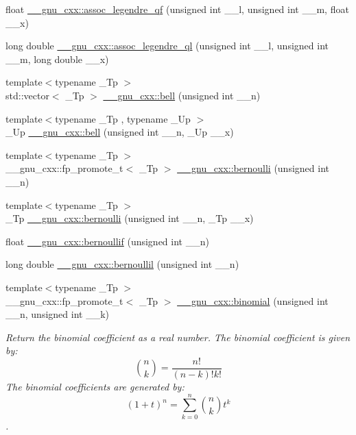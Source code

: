 \begin{DoxyCompactItemize}
\item 
float \hyperlink{group__mathsf__gnu_ga61d651dc8b3c42fe47a02b36e95f72c0}{\+\_\+\+\_\+gnu\+\_\+cxx\+::assoc\+\_\+legendre\+\_\+qf} (unsigned int \+\_\+\+\_\+l, unsigned int \+\_\+\+\_\+m, float \+\_\+\+\_\+x)
\item 
long double \hyperlink{group__mathsf__gnu_ga07a9e571759c6d24e96da8cc8268f91e}{\+\_\+\+\_\+gnu\+\_\+cxx\+::assoc\+\_\+legendre\+\_\+ql} (unsigned int \+\_\+\+\_\+l, unsigned int \+\_\+\+\_\+m, long double \+\_\+\+\_\+x)
\item 
{\footnotesize template$<$typename \+\_\+\+Tp $>$ }\\std\+::vector$<$ \+\_\+\+Tp $>$ \hyperlink{group__mathsf__gnu_gac07286d722248a7f3c65a13b49b1fef5}{\+\_\+\+\_\+gnu\+\_\+cxx\+::bell} (unsigned int \+\_\+\+\_\+n)
\item 
{\footnotesize template$<$typename \+\_\+\+Tp , typename \+\_\+\+Up $>$ }\\\+\_\+\+Up \hyperlink{group__mathsf__gnu_ga1e87244cb33a10de204856cafb19046f}{\+\_\+\+\_\+gnu\+\_\+cxx\+::bell} (unsigned int \+\_\+\+\_\+n, \+\_\+\+Up \+\_\+\+\_\+x)
\item 
{\footnotesize template$<$typename \+\_\+\+Tp $>$ }\\\+\_\+\+\_\+gnu\+\_\+cxx\+::fp\+\_\+promote\+\_\+t$<$ \+\_\+\+Tp $>$ \hyperlink{group__mathsf__gnu_gad339f0011df1967ec6c9e55bd1547bf4}{\+\_\+\+\_\+gnu\+\_\+cxx\+::bernoulli} (unsigned int \+\_\+\+\_\+n)
\item 
{\footnotesize template$<$typename \+\_\+\+Tp $>$ }\\\+\_\+\+Tp \hyperlink{group__mathsf__gnu_ga140e17e038ab0e3875c1b3fad09bc991}{\+\_\+\+\_\+gnu\+\_\+cxx\+::bernoulli} (unsigned int \+\_\+\+\_\+n, \+\_\+\+Tp \+\_\+\+\_\+x)
\item 
float \hyperlink{group__mathsf__gnu_gabcd77f012ae74989c4bb9ca61978481d}{\+\_\+\+\_\+gnu\+\_\+cxx\+::bernoullif} (unsigned int \+\_\+\+\_\+n)
\item 
long double \hyperlink{group__mathsf__gnu_gaac8f04abfdd6b744d11cb73ec1f564b1}{\+\_\+\+\_\+gnu\+\_\+cxx\+::bernoullil} (unsigned int \+\_\+\+\_\+n)
\item 
{\footnotesize template$<$typename \+\_\+\+Tp $>$ }\\\+\_\+\+\_\+gnu\+\_\+cxx\+::fp\+\_\+promote\+\_\+t$<$ \+\_\+\+Tp $>$ \hyperlink{group__mathsf__gnu_gabd0cf6e3f1e1d36c4c45f118e34a5ca2}{\+\_\+\+\_\+gnu\+\_\+cxx\+::binomial} (unsigned int \+\_\+\+\_\+n, unsigned int \+\_\+\+\_\+k)
\begin{DoxyCompactList}\small\item\em Return the binomial coefficient as a real number. The binomial coefficient is given by\+: \[ \binom{n}{k} = \frac{n!}{(n-k)! k!} \] The binomial coefficients are generated by\+: \[ \left(1 + t\right)^n = \sum_{k=0}^n \binom{n}{k} t^k \]. \end{DoxyCompactList}\item 

\end{DoxyCompactItemize}
